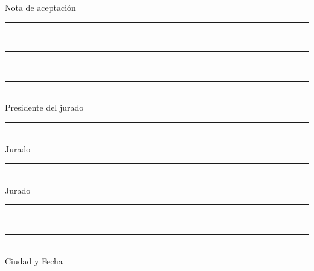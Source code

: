 \documentclass[twoside,letterpaper,12pt]{report}
\begin{document}
\begin{flushright}
	Nota de aceptación\\
	\vspace{1cm}
	\rule{\textwidth}{1pt}\\
	\vspace{1cm}
	\rule{\textwidth}{1pt}\\
	\vspace{1cm}
	\rule{\textwidth}{1pt}\\
	\vspace{1.3cm}
	Presidente del jurado\\
	\vspace{1cm}
	\rule{\textwidth}{1pt}\\
	\vspace{1.3cm}
	Jurado\\
	\vspace{1cm}
	\rule{\textwidth}{1pt}\\
	\vspace{1.3cm}
	Jurado\\
	\vspace{1cm}
	\rule{\textwidth}{1pt}\\
	\vspace{2.5cm}
	\rule{\textwidth}{1pt}\\
	\vspace{.8cm}
	Ciudad y Fecha
\end{flushright}
\thispagestyle{empty}
\pagebreak



	\pdfbookmark[1]{\contentsname}{}
	\tableofcontents
	\cleardoublepage {}
	\listoftables
	\cleardoublepage {}
	\listoffigures
	\cleardoublepage {}
\end{document}
